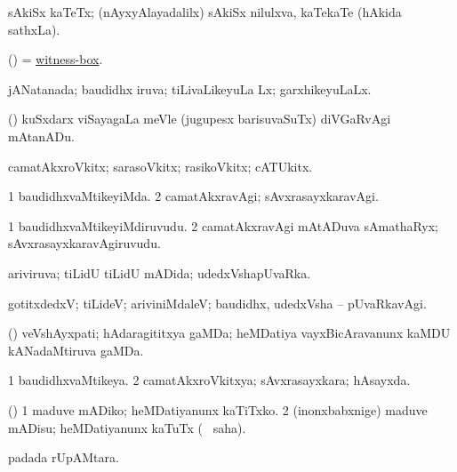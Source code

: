 \bentry
{} 
\gl{\nA}
\expl{}
\bmng
sAkiSx kaTeTx; (nAyxyAlayadalilx) sAkiSx nilulxva, kaTekaTe (hAkida sathxLa). 
\emng
\eentry

\bentry
{} 
\gl{\nA}
\expl{}
\bmng
(\ame) = \hyperlink{witness-box}{witness-box}. 
\emng
\eentry

\bentry
{} 
\gl{\gu}
\expl{}
\bmng
jANatanada; baudidhx iruva; tiLivaLikeyuLa Lx; garxhikeyuLaLx. 
\emng
\eentry

\bentry
{} 
\gl{\kirx}
\expl{}
\bmng
(\AmA) kuSxdarx viSayagaLa meVle (jugupesx barisuvaSuTx) diVGaRvAgi mAtanADu. 
\emng
\eentry

\bentry
{} 
\gl{\nA}
\expl{}
\bmng
camatAkxroVkitx; sarasoVkitx; rasikoVkitx; cATUkitx. 
\emng
\eentry

\bentry
{} 
\gl{\kirxvi}
\expl{}
\bmng
\bnum
\num{1} baudidhxvaMtikeyiMda. 
\num{2} camatAkxravAgi; sAvxrasayxkaravAgi. 
\enum
\emng
\eentry

\bentry
{} 
\gl{\nA}
\expl{}
\bmng
\bnum
\num{1} baudidhxvaMtikeyiMdiruvudu. 
\num{2} camatAkxravAgi mAtADuva sAmathaRyx; sAvxrasayxkaravAgiruvudu. 
\enum
\emng
\eentry

\bentry
{} 
\gl{\gu}
\expl{}
\bmng
ariviruva; tiLidU tiLidU mADida; udedxVshapUvaRka. 
\emng
\eentry

\bentry
{} 
\gl{\kirxvi}
\expl{}
\bmng
gotitxdedxV; tiLideV; ariviniMdaleV; baudidhx, udedxVsha -- pUvaRkavAgi. 
\emng
\eentry

\bentry
{} 
\gl{\nA}
\expl{}
\bmng
(\pArxparx) veVshAyxpati; hAdaragititxya gaMDa; heMDatiya vayxBicAravanunx kaMDU kANadaMtiruva gaMDa. 
\emng
\eentry

\bentry
{} 
\gl{\gu}
\bmng
\bnum
\num{1} baudidhxvaMtikeya. 
\num{2} camatAkxroVkitxya; sAvxrasayxkara; hAsayxda. 
\enum
\emng
\eentry

\bentry
{} 
\gl{\akirx}
\expl{}
\bmng
(\pArxparx) 
\bnum
\num{1} maduve mADiko; heMDatiyanunx kaTiTxko. 
\num{2} (inonxbabxnige) maduve mADisu; heMDatiyanunx kaTuTx ( \akirx\ saha). 
\enum
\emng
\eentry

\bentry
{} 
\gl{\nA}
\expl{}
\bmng
{} padada rUpAMtara. 
\emng
\eentry

